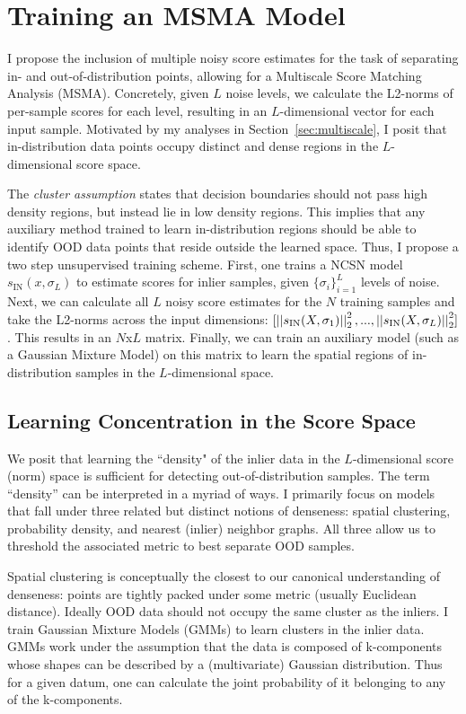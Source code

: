 \section{Training an MSMA Model}

I propose the inclusion of multiple noisy score estimates for the task of separating in- and out-of-distribution points, allowing for a Multiscale Score Matching Analysis (MSMA). Concretely, given $L$ noise levels, we calculate the L2-norms of per-sample scores for each level, resulting in an $L$-dimensional vector for each input sample. Motivated by my analyses in Section~\ref{sec:multiscale}, I posit that in-distribution data points occupy distinct and dense regions in the $L$-dimensional score space.

The \textit{cluster assumption} states that decision boundaries should not pass high density regions, but instead lie in low density regions. This implies that any auxiliary method trained to learn in-distribution regions should be able to identify OOD data points that reside outside the learned space. Thus, I propose a two step unsupervised training scheme. First, one trains a NCSN model $s_{\text{IN}}(x, \sigma_L)$ to estimate scores for inlier samples, given $\{\sigma_i\}_{i=1}^L$ levels of noise. Next, we can calculate all $L$ noisy score estimates for the $N$ training samples and take the L2-norms across the input dimensions: $[\left|\left| {  s_{\text{IN}} (X, \sigma_1) } \right|\right|_2^2, ... , \left|\left| {  s_{\text{IN}} (X, \sigma_L) } \right|\right|_2^2 ]$. This results in an $N$x$L$ matrix. Finally, we can train an auxiliary model (such as a Gaussian Mixture Model) on this matrix to learn the spatial regions of in-distribution samples in the $L$-dimensional space.

\subsection*{Learning Concentration in the Score Space}

We posit that learning the ``density" of the inlier data in the $L$-dimensional score (norm) space is sufficient for detecting out-of-distribution samples. The term “density” can be interpreted in a myriad of ways. I primarily focus on models that fall under three related but distinct notions of denseness: spatial clustering, probability density, and nearest (inlier) neighbor graphs. All three allow us to threshold the associated metric to best separate OOD samples.

Spatial clustering is conceptually the closest to our canonical understanding of denseness: points are tightly packed under some metric (usually Euclidean distance). Ideally OOD data should not occupy the same cluster as the inliers. I train Gaussian Mixture Models (GMMs) to learn clusters in the inlier data. GMMs work under the assumption that the data is composed of k-components whose shapes can be described by a (multivariate) Gaussian distribution. Thus for a given datum, one can calculate the joint probability of it belonging to any of the k-components.

